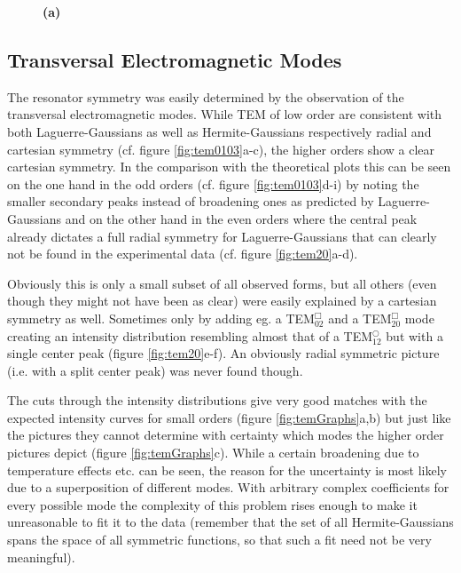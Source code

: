 \documentclass[a4paper]{scrartcl}
\numberwithin{equation}{section}
\numberwithin{figure}{section}
\numberwithin{table}{section}
\begin{document}
\begin{figure}
\centering
\hfill
\caption{\small \textbf{(a)} }
\label{fig:diode}
\end{figure}











\subsection{Transversal Electromagnetic Modes}
The resonator symmetry was easily determined by the observation of the transversal electromagnetic modes. While TEM of low order are consistent with both Laguerre-Gaussians as well as Hermite-Gaussians respectively radial and cartesian symmetry (cf. figure \ref{fig:tem0103}a-c), the higher orders show a clear cartesian symmetry. In the comparison with the theoretical plots this can be seen on the one hand in the odd orders (cf. figure \ref{fig:tem0103}d-i) by noting the smaller secondary peaks instead of broadening ones as predicted by Laguerre-Gaussians and on the other hand in the even orders where the central peak already dictates a full radial symmetry for Laguerre-Gaussians that can clearly not be found in the experimental data (cf. figure \ref{fig:tem20}a-d).

Obviously this is only a small subset of all observed forms, but all others (even though they might not have been as clear) were easily explained by a cartesian symmetry as well. Sometimes only by adding eg. a TEM$^\Box_{02}$ and a TEM$^\Box_{20}$ mode creating an intensity distribution resembling almost that of a TEM$^\bigcirc_{12}$ but with a single center peak (figure \ref{fig:tem20}e-f). An obviously radial symmetric picture (i.e. with a split center peak) was never found though.

The cuts through the intensity distributions give very good matches with the expected intensity curves for small orders (figure \ref{fig:temGraphs}a,b) but just like the pictures they cannot determine with certainty which modes the higher order pictures depict (figure \ref{fig:temGraphs}c). While a certain broadening due to temperature effects etc. can be seen, the reason for the uncertainty is most likely due to a superposition of different modes. With arbitrary complex coefficients for every possible mode the complexity of this problem rises enough to make it unreasonable to fit it to the data (remember that the set of all Hermite-Gaussians spans the space of all symmetric functions, so that such a fit need not be very meaningful).
\end{document}
